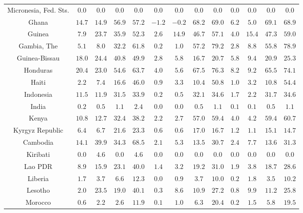 \begin{longtable}{ccccccccccccc}
Micronesia, Fed. Sts. & $0.0$ & $0.0$ & $0.0$ & $0.0$ & $0.0$ & $0.0$ & $0.0$ & $0.0$ & $0.0$ & $0.0$ & $0.0$ & $0.0$ \\ 
Ghana & $14.7$ & $14.9$ & $56.9$ & $57.2$ & $-1.2$ & $-0.2$ & $68.2$ & $69.0$ & $6.2$ & $5.0$ & $69.1$ & $68.9$ \\ 
Guinea & $7.9$ & $23.7$ & $35.9$ & $52.3$ & $2.6$ & $14.9$ & $46.7$ & $57.1$ & $4.0$ & $15.4$ & $47.3$ & $59.0$ \\ 
Gambia, The & $5.1$ & $8.0$ & $32.2$ & $61.8$ & $0.2$ & $1.0$ & $57.2$ & $79.2$ & $2.8$ & $8.8$ & $55.8$ & $78.9$ \\ 
Guinea-Bissau & $18.0$ & $24.4$ & $40.8$ & $49.9$ & $2.8$ & $5.8$ & $16.7$ & $20.7$ & $5.8$ & $9.4$ & $20.9$ & $25.3$ \\ 
Honduras & $20.4$ & $23.0$ & $54.6$ & $63.7$ & $4.0$ & $5.6$ & $67.5$ & $76.3$ & $8.2$ & $9.2$ & $65.5$ & $74.1$ \\ 
Haiti & $2.2$ & $7.4$ & $16.6$ & $46.0$ & $0.9$ & $3.3$ & $10.4$ & $50.8$ & $1.0$ & $3.2$ & $10.8$ & $54.4$ \\ 
Indonesia & $11.5$ & $11.9$ & $31.5$ & $33.9$ & $0.2$ & $0.5$ & $32.1$ & $34.6$ & $1.7$ & $2.2$ & $31.7$ & $34.6$ \\ 
India & $0.2$ & $0.5$ & $1.1$ & $2.4$ & $0.0$ & $0.0$ & $0.5$ & $1.1$ & $0.1$ & $0.1$ & $0.5$ & $1.1$ \\ 
Kenya & $10.8$ & $12.7$ & $32.4$ & $38.2$ & $2.2$ & $2.7$ & $57.0$ & $59.4$ & $4.0$ & $4.2$ & $59.4$ & $60.7$ \\ 
Kyrgyz Republic & $6.4$ & $6.7$ & $21.6$ & $23.3$ & $0.6$ & $0.6$ & $17.0$ & $16.7$ & $1.2$ & $1.1$ & $15.1$ & $14.7$ \\ 
Cambodia & $14.1$ & $39.9$ & $34.3$ & $68.5$ & $2.1$ & $5.3$ & $13.5$ & $30.7$ & $2.4$ & $7.7$ & $13.6$ & $31.3$ \\ 
Kiribati & $0.0$ & $4.6$ & $0.0$ & $4.6$ & $0.0$ & $0.0$ & $0.0$ & $0.0$ & $0.0$ & $0.0$ & $0.0$ & $0.0$ \\ 
Lao PDR & $8.9$ & $15.9$ & $23.1$ & $40.0$ & $1.4$ & $3.2$ & $19.2$ & $31.0$ & $1.9$ & $3.8$ & $18.7$ & $28.6$ \\ 
Liberia & $1.7$ & $3.7$ & $6.6$ & $12.3$ & $0.0$ & $0.9$ & $3.7$ & $10.0$ & $0.2$ & $1.8$ & $3.5$ & $10.2$ \\ 
Lesotho & $2.0$ & $23.5$ & $19.0$ & $40.1$ & $0.3$ & $8.6$ & $10.9$ & $27.2$ & $0.8$ & $9.9$ & $11.2$ & $25.8$ \\ 
Morocco & $0.6$ & $2.2$ & $2.6$ & $11.9$ & $0.1$ & $1.0$ & $6.3$ & $20.4$ & $0.2$ & $1.5$ & $5.8$ & $19.5$ \\ 

\end{longtable}
